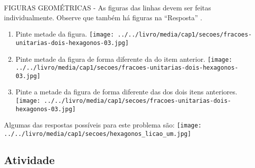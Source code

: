 \documentclass[a4paper,12pt,twoside]{book}
\begin{document}
\begin{imagem*}[breakable]{}{}   FIGURAS GEOMÉTRICAS - As figuras das linhas devem ser feitas individualmente. Observe que também há figuras na   ``Resposta''  .  
\end{imagem*}
\begin{enumerate} [\quad I)] %
  \item     Pinte metade da figura.     \mbox{} \newline              \texttt{[image: ../../livro/media/cap1/secoes/fracoes-unitarias-dois-hexagonos-03.jpg]}
  \item     Pinte metade da figura de forma diferente da do item anterior.     \mbox{} \newline              \texttt{[image: ../../livro/media/cap1/secoes/fracoes-unitarias-dois-hexagonos-03.jpg]}
  \item     Pinte a metade da figura de forma diferente das dos dois itens anteriores.     \mbox{} \newline              \texttt{[image: ../../livro/media/cap1/secoes/fracoes-unitarias-dois-hexagonos-03.jpg]}
\end{enumerate} %




\begin{resposta*}[breakable]{}{}  
  
  Algumas das respostas possíveis para este problema são:  
    \texttt{[image: ../../livro/media/cap1/secoes/hexagonos\_licao\_um.jpg]}  
  
\end{resposta*}




\subsection{Atividade}
\end{document}
